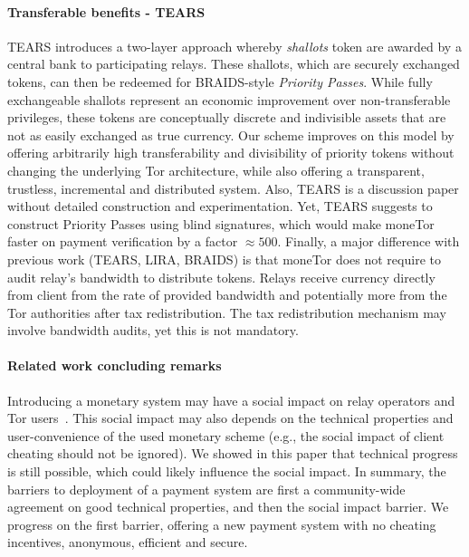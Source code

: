 \paragraph*{Transferable benefits - TEARS} TEARS introduces a two-layer approach whereby \emph{shallots}
token are awarded by a central bank to participating relays. These shallots,
which are securely exchanged tokens, can then be redeemed for BRAIDS-style
\emph{Priority Passes}. While fully exchangeable shallots represent an economic
improvement over non-transferable privileges, these tokens are conceptually
discrete and indivisible assets that are not as easily exchanged as true
currency. Our scheme improves on this model by offering arbitrarily high
transferability and divisibility of priority tokens without changing the
underlying Tor architecture, while also offering a transparent, trustless, incremental and distributed system. Also, TEARS is a discussion paper without detailed construction and experimentation. Yet, TEARS suggests to construct Priority Passes using blind signatures, which would make moneTor faster on payment verification by a factor $\approx 500$. Finally, a major difference with previous work (TEARS, LIRA, BRAIDS) is that moneTor does not require to audit relay's bandwidth to distribute tokens. Relays receive currency directly from client from the rate of provided bandwidth and potentially more from the Tor authorities after tax redistribution. The tax redistribution mechanism may involve bandwidth audits, yet this is not mandatory.

\paragraph*{Related work concluding remarks}
Introducing a monetary system may have a social impact on relay operators and Tor users~\cite{jansenblogpost}. This social impact may also depends on the technical properties and user-convenience of the used monetary scheme (e.g., the social impact of client cheating should not be ignored). We showed in this paper that technical progress is still possible, which could likely influence the social impact. In summary, the barriers to deployment of a payment system are first a community-wide agreement on good technical properties, and then the social impact barrier. We progress on the first barrier, offering a new payment system with no cheating incentives, anonymous, efficient and secure.


